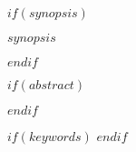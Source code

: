 \maketitle

$if(synopsis)$
\begin{synopsis}
$synopsis$
\end{synopsis}
$endif$

$if(abstract)$
\begin{abstract}
$abstract$
\end{abstract}
$endif$


$if(keywords)$
$endif$